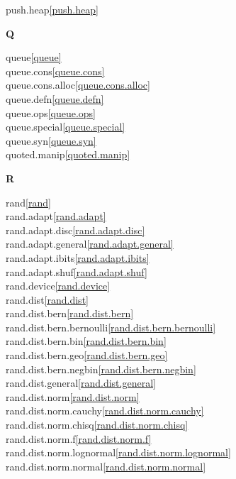 \begin{multicols}{2}
push.heap\quad\ref{push.heap}\\
\par \textbf{Q}\par
queue\quad\ref{queue}\\
queue.cons\quad\ref{queue.cons}\\
queue.cons.alloc\quad\ref{queue.cons.alloc}\\
queue.defn\quad\ref{queue.defn}\\
queue.ops\quad\ref{queue.ops}\\
queue.special\quad\ref{queue.special}\\
queue.syn\quad\ref{queue.syn}\\
quoted.manip\quad\ref{quoted.manip}\\
\par \textbf{R}\par
rand\quad\ref{rand}\\
rand.adapt\quad\ref{rand.adapt}\\
rand.adapt.disc\quad\ref{rand.adapt.disc}\\
rand.adapt.general\quad\ref{rand.adapt.general}\\
rand.adapt.ibits\quad\ref{rand.adapt.ibits}\\
rand.adapt.shuf\quad\ref{rand.adapt.shuf}\\
rand.device\quad\ref{rand.device}\\
rand.dist\quad\ref{rand.dist}\\
rand.dist.bern\quad\ref{rand.dist.bern}\\
rand.dist.bern.bernoulli\quad\ref{rand.dist.bern.bernoulli}\\
rand.dist.bern.bin\quad\ref{rand.dist.bern.bin}\\
rand.dist.bern.geo\quad\ref{rand.dist.bern.geo}\\
rand.dist.bern.negbin\quad\ref{rand.dist.bern.negbin}\\
rand.dist.general\quad\ref{rand.dist.general}\\
rand.dist.norm\quad\ref{rand.dist.norm}\\
rand.dist.norm.cauchy\quad\ref{rand.dist.norm.cauchy}\\
rand.dist.norm.chisq\quad\ref{rand.dist.norm.chisq}\\
rand.dist.norm.f\quad\ref{rand.dist.norm.f}\\
rand.dist.norm.lognormal\quad\ref{rand.dist.norm.lognormal}\\
rand.dist.norm.normal\quad\ref{rand.dist.norm.normal}\\

\end{multicols}

